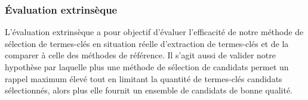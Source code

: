       \subsubsection{Évaluation extrinsèque}
      \label{subsubsec:main:domain_independent_keyphrase_extraction-keyphrase_candidate_selection-evaluation-extrinsic_evaluation}
        L'évaluation extrinsèque a pour objectif d'évaluer l'efficacité de notre
        méthode de sélection de termes-clés en situation réelle d'extraction de
        termes-clés et de la comparer à celle des méthodes de référence.
        Il s'agit aussi de valider notre hypothèse par laquelle plus une méthode
        de sélection de candidats permet un rappel maximum élevé tout en
        limitant la quantité de termes-clés candidats sélectionnés, alors plus
        elle fournit un ensemble de candidats de bonne qualité.

